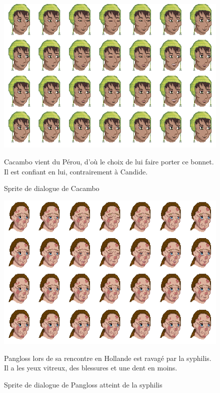 \documentclass[11pt]{article}
\begin{document}
\begin{appendices}
\begin{figure}[H]
\includegraphics[scale=0.4]{cacamboFaceAnimation}
\centering
\caption{Sprite de dialogue de Cacambo}
Cacambo vient du Pérou, d'où le choix de lui faire porter ce bonnet. Il est confiant en lui, contrairement à Candide.
\end{figure}

\begin{figure}[H]
\includegraphics[scale=0.4]{panglossSyphilisFaceAnimation}
\centering
\caption{Sprite de dialogue de Pangloss atteint de la syphilis}
Pangloss lors de sa rencontre en Hollande est ravagé par la syphilis. Il a les yeux vitreux, des blessures et une dent en moins.
\end{figure}


\end{appendices}
\end{document}
